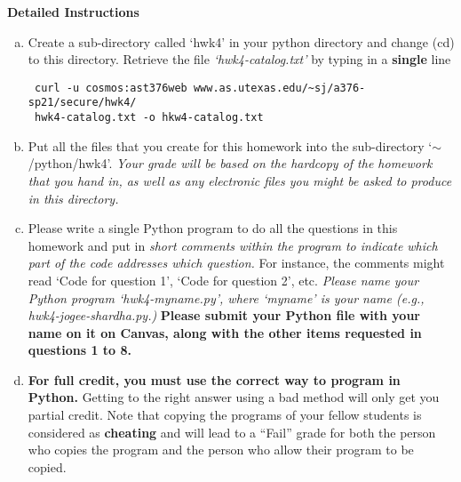 \documentclass[11pt]{article}    %
\begin{document}
\begin{center}
\vspace{3.0 mm}
\noindent
{\bf{ Detailed Instructions}}
\end{center}

\begin{enumerate}[(a)]

\item 
\vspace{2.0 mm}
\noindent
Create a sub-directory called `hwk4'  in your python directory and change 
(cd) to this directory. 
Retrieve the file {\it `hwk4-catalog.txt'}  by typing in a {\bf single} line 
\begin{lstlisting}
 curl -u cosmos:ast376web www.as.utexas.edu/~sj/a376-sp21/secure/hwk4/
 hwk4-catalog.txt -o hkw4-catalog.txt
\end{lstlisting} 

\item 
\noindent
Put all the files that you create for this homework into the 
sub-directory  `$\sim$/python/hwk4'.
{\it Your grade will be based  on the hardcopy of the homework that 
you hand in, as well as any electronic files you might be asked to 
produce in this directory.}



\item 
\noindent
Please write a single Python program 
to do all the questions in this homework and put in 
{\it {short comments within the program to indicate which part of the code 
addresses which question.}} For instance, the comments might read `Code
for question 1',  `Code for  question 2', etc. 
{\it{ Please name your Python program    `hwk4-myname.py', where  `myname' is  
your name  (e.g.,   hwk4-jogee-shardha.py.)}}  
{\bf{Please submit your Python file with your name on it on
Canvas, along with the other items requested in questions 1 to 8.}}


\item 
\noindent
{\bf{
For full credit, you must use the correct  way to program
in Python.}} Getting to the right answer using a bad method will 
only get you  partial credit. Note that copying the programs of your 
fellow students is considered as {\bf cheating} and will lead to a ``Fail'' grade for both
the person who copies the program and the person who allow 
their program to be copied.
\end{enumerate}
\end{document}
